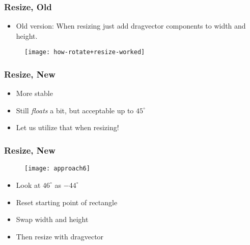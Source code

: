
\begin{frame}
	\frametitle{Resize, Old}
	\begin{itemize}
		\item Old version: When resizing just add dragvector components to width and height.
		
	\end{itemize}
	\begin{figure}
		\centering
		\texttt{[image: how-rotate+resize-worked]}
	\end{figure}
	\end{frame}
		
		
\begin{frame}
	\frametitle{Resize, New}
	
		\begin{itemize}
			\item More stable
			\item Still \textit{floats} a bit, but acceptable up to $45 ^\circ$
			\item Let us utilize that when resizing!
		\end{itemize}
	
\end{frame}

\begin{frame}
	\frametitle{Resize, New}
			\begin{figure}
			\centering
				\texttt{[image: approach6]}
			\end{figure}
			\begin{itemize}
			\item Look at $46^\circ$ as $-44^\circ$
			\item Reset starting point of rectangle
			\item Swap width and height
			\item Then resize with dragvector
			\end{itemize}
			
\end{frame}

